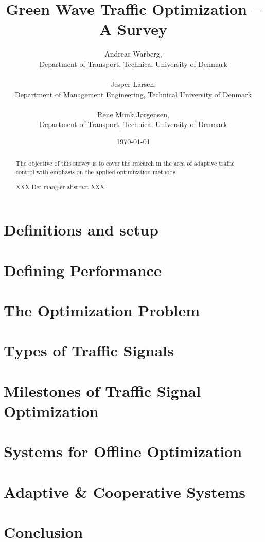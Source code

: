 \documentclass [a4paper, 10pt]{article}
\title{Green Wave Traffic Optimization -- A Survey}
\author{Andreas Warberg,\\ Department of Transport, Technical University of Denmark\\ ~ \\ 
Jesper Larsen,\\ Department of Management Engineering, Technical University of Denmark\\ ~ \\ Rene Munk J{\o}rgensen,\\ Department of Transport, Technical University of Denmark}
\date{\today}
\begin{document}
\setlength{\parindent}{4mm}

\maketitle

\begin{abstract}
The objective of this survey is to cover the research in the area of
adaptive traffic control with emphasis on the applied optimization
methods.

XXX Der mangler abstract XXX

\end{abstract}



\section{Definitions and setup}


%

\section{Defining Performance}


\section{The Optimization Problem}


\section{Types of Traffic Signals}


%

\section{Milestones of Traffic Signal Optimization}


\section{Systems for Offline Optimization}


\section{Adaptive \& Cooperative Systems}


%

\section{Conclusion}




\end{document}
